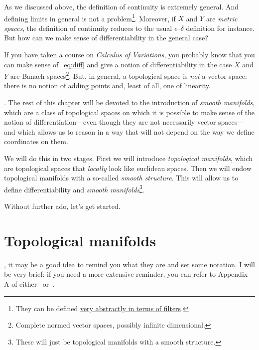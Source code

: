 As we discussed above, the definition of continuity is extremely general. And defining limits in general is not a problem\footnote{They can be defined \href{https://en.wikipedia.org/wiki/Filter_(mathematics)\#Examples}{very abstractly in terms of filters}.}. Moreover, if $X$ and $Y$ are \emph{metric spaces}, the definition of continuity reduces to the usual $\epsilon$--$\delta$ definition for instance.
But how can we make sense of differentiability in the general case?

If you have taken a course on \emph{Calculus of Variations}, you probably know that you can make sense of~\eqref{eq:diff} and give a notion of differentiability in the case $X$ and $Y$ are Banach spaces\footnote{Complete normed vector spaces, possibly infinite dimensional.}.
But, in general, a topological space is \emph{not} a vector space: there is no notion of adding points and, least of all, one of linearity.

.
The rest of this chapter will be devoted to the introduction of \emph{smooth manifolds}, which are a class of topological spaces on which it is possible to make sense of the notion of differentiation---even though they are not necessarily vector spaces---and which allows us to reason in a way that will not depend on the way we define coordinates on them.

We will do this in two stages.
First we will introduce \emph{topological manifolds}, which are topological spaces that \emph{locally} look like euclidean spaces.
Then we will endow topological manifolds with a so-called \emph{smooth structure}.
This will allow us to define differentiability and \emph{smooth manifolds}\footnote{These will just be topological manifolds with a smooth structure.}.

Without further ado, let's get started.

\section{Topological manifolds}\label{sec:top_manifolds}

, it may be a good idea to remind you what they are and set some notation.
I will be very brief: if you need a more extensive reminder, you can refer to Appendix A of either~\cite{book:tu} or~\cite{book:lee}.

